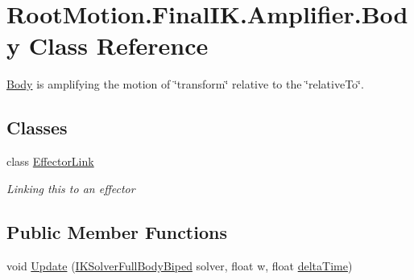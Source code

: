 \hypertarget{class_root_motion_1_1_final_i_k_1_1_amplifier_1_1_body}{}\section{Root\+Motion.\+Final\+I\+K.\+Amplifier.\+Body Class Reference}
\label{class_root_motion_1_1_final_i_k_1_1_amplifier_1_1_body}


\mbox{\hyperlink{class_root_motion_1_1_final_i_k_1_1_amplifier_1_1_body}{Body}} is amplifying the motion of \char`\"{}transform\char`\"{} relative to the \char`\"{}relative\+To\char`\"{}.  


\subsection*{Classes}
\begin{DoxyCompactItemize}
\item 
class \mbox{\hyperlink{class_root_motion_1_1_final_i_k_1_1_amplifier_1_1_body_1_1_effector_link}{Effector\+Link}}
\begin{DoxyCompactList}\small\item\em Linking this to an effector \end{DoxyCompactList}\end{DoxyCompactItemize}
\subsection*{Public Member Functions}
\begin{DoxyCompactItemize}
\item 
void \mbox{\hyperlink{class_root_motion_1_1_final_i_k_1_1_amplifier_1_1_body_a64f2fe68e3ccdbcc8ea8ec234481c212}{Update}} (\mbox{\hyperlink{class_root_motion_1_1_final_i_k_1_1_i_k_solver_full_body_biped}{I\+K\+Solver\+Full\+Body\+Biped}} solver, float w, float \mbox{\hyperlink{class_root_motion_1_1_final_i_k_1_1_offset_modifier_ac5aeb27ca30313e6791867cbd4109940}{delta\+Time}})
\end{DoxyCompactItemize}
